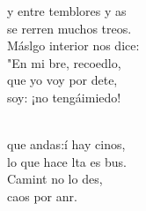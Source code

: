 \begin{cancion}
	y entre temblores y as \\
	se rerren muchos treos. \\
	Máslgo interior nos dice: \\
	"En mi bre, recoedlo,\\
	que yo voy por dete, \\
	 soy: ¡no tengáimiedo!\\\jump\\
	\begin{chorus}%
	 que andas:í hay cinos,  \\
	lo que hace lta es bus.\\
	Camint no lo des,\\
	 caos por anr.\\
	\end{chorus}%
	\jump\\
\end{cancion}%
